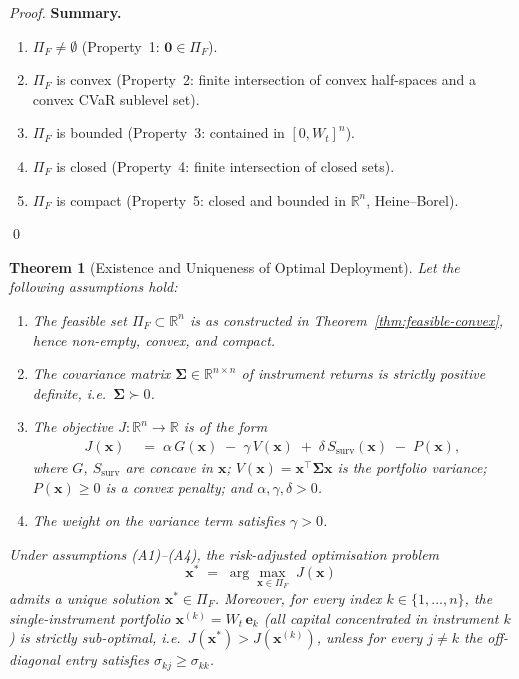 \documentclass[12pt,openany]{book}
\newcommand{\bfx}{\mathbf{x}}
\numberwithin{equation}{chapter}
\theoremstyle{plain}
\newtheorem{theorem}{Theorem}[chapter]
\theoremstyle{definition}
\theoremstyle{remark}
\numberwithin{equation}{chapter}
\theoremstyle{plain}
\newcommand{\bfe}{\mathbf{e}}
\newcommand{\bfSigma}{\boldsymbol{\Sigma}}
\begin{document}
\begin{proof}
\medskip
\noindent\textbf{Summary.}

\begin{enumerate}
  \item $\Pi_F \neq \emptyset$ (Property~1: $\mathbf{0} \in \Pi_F$).
  \item $\Pi_F$ is convex (Property~2: finite intersection of convex
        half-spaces and a convex CVaR sublevel set).
  \item $\Pi_F$ is bounded (Property~3: contained in $[0,W_t]^n$).
  \item $\Pi_F$ is closed (Property~4: finite intersection of closed
        sets).
  \item $\Pi_F$ is compact (Property~5: closed and bounded in
        $\mathbb{R}^n$, Heine--Borel).
\end{enumerate}
\qed
\end{proof}

\begin{theorem}[Existence and Uniqueness of Optimal Deployment]
\label{thm:concentration-suboptimal}
Let the following assumptions hold:
\begin{enumerate}
  \item[\textup{(A1)}] The feasible set $\Pi_F \subset \mathbb{R}^n$
        is as constructed in Theorem~\ref{thm:feasible-convex},
        hence non-empty, convex, and compact.
  \item[\textup{(A2)}] The covariance matrix $\bfSigma \in
        \mathbb{R}^{n \times n}$ of instrument returns is strictly
        positive definite, i.e.\ $\bfSigma \succ 0$.
  \item[\textup{(A3)}] The objective $J : \mathbb{R}^n \to
        \mathbb{R}$ is of the form
        \begin{align}
          J(\bfx)
            &\;=\; \alpha\, G(\bfx)
               \;-\; \gamma\, V(\bfx)
               \;+\; \delta\, S_{\mathrm{surv}}(\bfx)
               \;-\; P(\bfx),
          \label{eq:J-components}
        \end{align}
        where $G$, $S_{\mathrm{surv}}$ are concave in $\bfx$;
        $V(\bfx) = \bfx^\top \bfSigma \bfx$ is the portfolio
        variance; $P(\bfx) \geq 0$ is a convex penalty; and
        $\alpha, \gamma, \delta > 0$.
  \item[\textup{(A4)}] The weight on the variance term satisfies
        $\gamma > 0$.
\end{enumerate}
Under assumptions \textup{(A1)--(A4)}, the risk-adjusted
optimisation problem
\begin{equation}
  \bfx^* \;=\; \arg\max_{\bfx \in \Pi_F}\; J(\bfx)
  \label{eq:deployment-opt}
\end{equation}
admits a \emph{unique} solution $\bfx^* \in \Pi_F$.
Moreover, for every index $k \in \{1,\ldots,n\}$, the
single-instrument portfolio $\bfx^{(k)} = W_t\,\bfe_k$ (all
capital concentrated in instrument $k$) is \emph{strictly
sub-optimal}, i.e.\ $J(\bfx^*) > J(\bfx^{(k)})$, unless for
every $j \neq k$ the off-diagonal entry satisfies
$\sigma_{kj} \geq \sigma_{kk}$.
\end{theorem}
\end{document}
